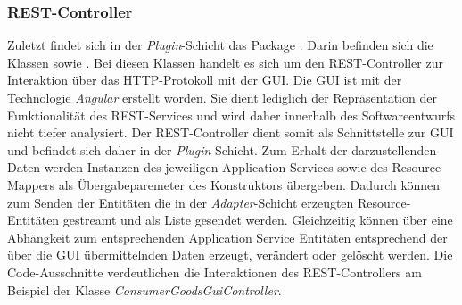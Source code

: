 \subsubsection*{REST-Controller}
Zuletzt findet sich in der \textit{Plugin}-Schicht das Package \href{https://github.com/lucasmerkel/dhbw-advancedswe-programmentwurf/tree/main/swe_programmentwurf/consumergoods-inventory-planner/0-cip-plugins/src/main/java/de/dhbw/cip/plugins/rest}{}.
Darin befinden sich die Klassen \href{https://github.com/lucasmerkel/dhbw-advancedswe-programmentwurf/blob/d5c89113d12c3b877ddc4d6a99225b277ddd468f/swe_programmentwurf/consumergoods-inventory-planner/0-cip-plugins/src/main/java/de/dhbw/cip/plugins/rest/ConsumerGoodsGuiController.java}{} sowie \href{https://github.com/lucasmerkel/dhbw-advancedswe-programmentwurf/blob/d5c89113d12c3b877ddc4d6a99225b277ddd468f/swe_programmentwurf/consumergoods-inventory-planner/0-cip-plugins/src/main/java/de/dhbw/cip/plugins/rest/StorageGuiController.java}{}.
Bei diesen Klassen handelt es sich um den \ac{REST}-Controller zur Interaktion über das HTTP-Protokoll mit der \ac{GUI}.
Die GUI ist mit der Technologie \textit{Angular} erstellt worden.
Sie dient lediglich der Repräsentation der Funktionalität des \ac{REST}-Services und wird daher innerhalb des Softwareentwurfs nicht tiefer analysiert.
Der \ac{REST}-Controller dient somit als Schnittstelle zur \ac{GUI} und befindet sich daher in der \textit{Plugin}-Schicht.
Zum Erhalt der darzustellenden Daten werden Instanzen des jeweiligen Application Services sowie des Resource Mappers als Übergabeparemeter des Konstruktors übergeben.
Dadurch können zum Senden der Entitäten die in der \textit{Adapter}-Schicht erzeugten Resource-Entitäten gestreamt und als Liste gesendet werden.
Gleichzeitig können über eine Abhängkeit zum entsprechenden Application Service Entitäten entsprechend der über die \ac{GUI} übermittelnden Daten erzeugt, verändert oder gelöscht werden.
Die Code-Ausschnitte verdeutlichen die Interaktionen des \ac{REST}-Controllers am Beispiel der Klasse \textit{ConsumerGoodsGuiController}.

